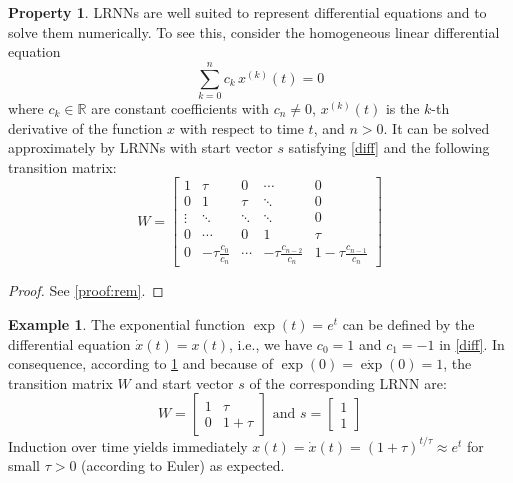 \documentclass[preprint,12pt,times,authoryear]{elsarticle}%
\theoremstyle{definition}
\newtheorem{exmp}{Example}
\newtheorem{prop}{Property}
\begin{document}
\begin{prop}\label{rem}
LRNNs are well suited to represent differential equations and to solve them
numerically. To see this, consider the homogeneous linear differential equation
\begin{equation}
	\sum_{k=0}^n c_k\,x^{(k)}(t) = 0 \label{diff}
\end{equation}
where $c_k \in \mathbb{R}$ are constant coefficients with $c_n \neq 0$,
$x^{(k)}(t)$ is the $k$-th derivative of the function $x$ with respect to time
$t$, and $n>0$. It can be solved approximately by LRNNs with start vector $s$
satisfying \cref{diff} and the following transition matrix:
\begin{equation} \label{mat}
  W = \left[ \begin{array}{*{5}{c}}
	1 & \tau & 0 & \cdots & 0\\
	0 & 1 & \tau & \ddots & 0\\
	\vdots & \ddots & \ddots & \ddots & 0\\
	0 & \cdots & 0 & 1 & \tau\\
	0 & -\tau \frac{c_0}{c_n} & \cdots & -\tau \frac{c_{n-2}}{c_n} & 1\!-\!\tau \frac{c_{n-1}}{c_n}
      \end{array} \right]
\end{equation}
\end{prop}

\begin{proof}
See \ref{proof:rem}.
\end{proof}

\begin{exmp}\label{exp}
The exponential function $\exp(t) = e^t$ can be defined by the differential
equation $\dot{x}(t) = x(t)$, i.e., we have $c_0 = 1$ and $c_1 = -1$ in
\cref{diff}. In consequence, according to \cref{rem} and because of $\exp(0)=\dot{\exp}(0)=1$,
the transition matrix $W$ and start vector $s$ of the corresponding LRNN are:
\[ W = \left[ \begin{array}{cc}
	1 & \tau\\
	0 & 1\!+\!\tau
   \end{array} \right]
   \text{~and~} s = \left[ \begin{array}{c}
	1\\
	1
   \end{array} \right]
\]
Induction over time yields immediately $x(t) = \dot{x}(t) = (1+\tau)^{t/\tau}
\approx e^t$ for small $\tau>0$ (according to Euler) as expected.
\end{exmp}
\end{document}
